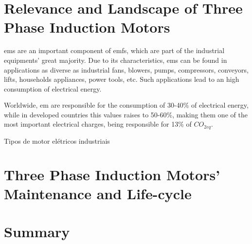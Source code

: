 \section{Relevance and Landscape of Three Phase Induction Motors} %
\label{sec:tpin_relevance}

\acrshort{em}s are an important component of \acrshort{emfs}, which are part of the industrial equipments' great majority. Due to its characteristics, \acrshort{em}s can be found in applications as diverse as industrial fans, blowers, pumps, compressors, conveyors, lifts, households appliances, power tools, etc. 
Such applications lead to an high consumption of electrical energy.

Worldwide, \acrshort{em} are responsible for the consumption of 30-40\% of electrical energy, while in developed countries this values raises to 50-60\%, making them one of the most important electrical charges, being responsible for 13\% of $CO_{2eq}$. 

Tipos de motor elétricos industriais ~\cite{Ferreira1}


\section{Three Phase Induction Motors' Maintenance and Life-cycle} %
\label{sec:Three_phase_induction_motors_maintenance_and_lyfe_cycle}

\section{Summary} %
\label{sec:tpem_summary}
